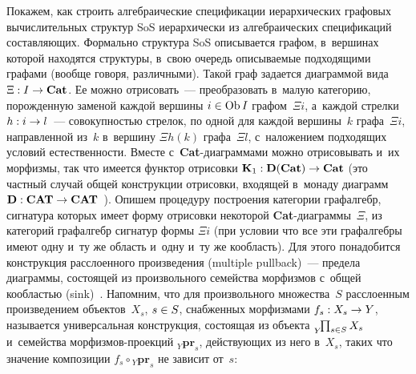 \begin{multicols}{2}
  Покажем, как строить алгебраические спецификации иерархических 
графовых вычислительных структур SoS иерархически из ал\-геб\-ра\-и\-че\-ских 
спецификаций со\-став\-ля\-ющих. Формально структура SoS описывается графом,
 в~вершинах которой находятся структуры, в~свою очередь опи\-сы\-ва\-емые 
подходящими графами (вообще говоря, различными). Такой граф задается 
диаграммой вида $\Xi : I\hm\to \mathbf{Cat}$. Ее можно отрисовать~--- 
преобразовать в~малую категорию, по\-рож\-ден\-ную заменой каж\-дой вершины 
$i\hm\in \mathrm{Ob}\,I$ графом~$\Xi i$, а~каж\-дой стрелки $h : i \hm\to  
l$~--- со\-во\-куп\-ностью стрелок, по одной для каж\-дой вершины~$k$ 
графа~$\Xi i$, на\-прав\-лен\-ной из~$k$ в~вершину $\Xi h(k)$ графа~$\Xi 
l$, с~наложением подходящих условий естест\-вен\-ности. Вместе  
с~\textbf{Cat}-диа\-грам\-ма\-ми можно отрисовывать и~их морфизмы, так что 
имеется функтор отрисовки $\mathbf{K}_1 : \mathbf{D}(\mathbf{Cat})\hm\to 
\mathbf{Cat}$ (это частный случай общей конструкции отрисовки, входящей 
в~монаду диаграмм $\mathbf{D} : \mathbf{CAT}\hm\to  
\mathbf{CAT}$~\cite{16-kov}). Опишем процедуру построения категории 
графалгебр, сигнатура которых имеет форму отрисовки некоторой  
\textbf{Cat}-диа\-грам\-мы~$\Xi$, из категорий графалгебр сигнатур формы 
$\Xi i$ (при условии что все эти графалгебры имеют одну и~ту же область 
и~одну и~ту же ко\-об\-ласть). Для этого понадобится конструкция расслоенного 
произведения (multiple pullback)~--- предела диаграммы, состоящей из 
произвольного семейства морфизмов с~общей ко\-об\-ластью 
(sink)~\cite[упражнение~11L]{9-kov}. Напомним, что для произвольного 
множества~$S$ расслоенным произведением объектов~$X_s$, $s\hm\in S$, 
снабженных морфизмами $f_s : X_s \hm\to  Y$, называется универсальная 
конструкция, состоящая из объекта ${\vphantom{\prod_{s\in S}}}_{Y}\!\!\prod_{s\in S}X_s$
и~семейства 
мор\-физ\-мов-про\-ек\-ций $_Y\mathbf{pr}_s$, дей\-ст\-ву\-ющих из него в~$X_s$, таких что значение 
композиции $f_s\circ {}_Y \mathbf{pr}_s$ не зависит от~$s$:

  \vspace*{1pt}
  
  \begin{center}  
    \mbox{%
\epsfxsize=50.166mm
}

\end{center}

\begin{figure*} %
  \vspace*{1pt}
  \begin{center}  
    \mbox{%
\epsfxsize=107.786mm
}



\end{center}
\end{figure*}
\end{multicols}
